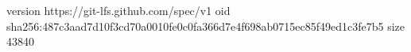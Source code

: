 version https://git-lfs.github.com/spec/v1
oid sha256:487c3aad7d10f3cd70a0010fe0c0fa366d7e4f698ab0715ec85f49ed1c3fe7b5
size 43840
